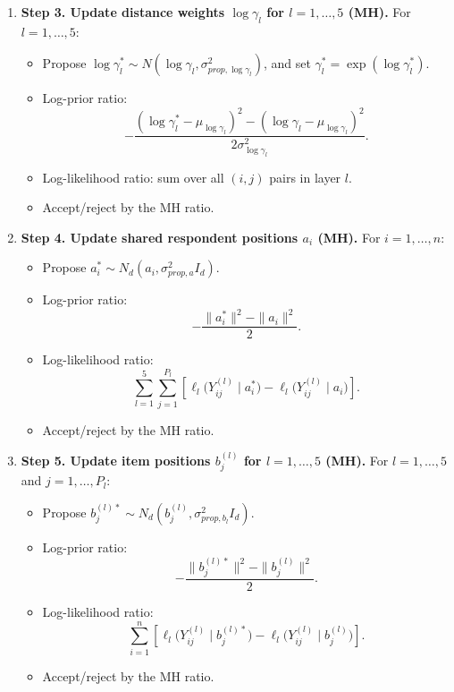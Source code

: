 \documentclass[11pt]{article}
\begin{document}
\begin{enumerate}[leftmargin=1.8em]
    \item \textbf{Step 3. Update distance weights $\log \gamma_l$ for $l=1,\dots,5$ (MH).}
    For $l=1,\dots,5$:
    \begin{itemize}[leftmargin=1.5em]
        \item Propose $\log \gamma_l^*\sim N(\log \gamma_l,\sigma_{prop,\log \gamma_l}^2)$, and set $\gamma_l^*=\exp(\log \gamma_l^*)$.
        \item Log-prior ratio:
        \[
        -\frac{(\log \gamma_l^*-\mu_{\log \gamma_l})^2-(\log \gamma_l-\mu_{\log \gamma_l})^2}{2\sigma_{\log \gamma_l}^2}.
        \]
        \item Log-likelihood ratio: sum over all $(i,j)$ pairs in layer $l$.
        \item Accept/reject by the MH ratio.
    \end{itemize}

    \item \textbf{Step 4. Update shared respondent positions $a_i$ (MH).}
    For $i=1,\dots,n$:
    \begin{itemize}[leftmargin=1.5em]
        \item Propose $a_i^*\sim N_d(a_i,\sigma_{prop,a}^2 I_d)$.
        \item Log-prior ratio:
        \[
        -\frac{\|a_i^*\|^2-\|a_i\|^2}{2}.
        \]
        \item Log-likelihood ratio:
        \[
        \sum_{l=1}^{5}\sum_{j=1}^{P_l}
        \left[\ell_l\bigl(Y_{ij}^{(l)}\mid a_i^*\bigr)-\ell_l\bigl(Y_{ij}^{(l)}\mid a_i\bigr)\right].
        \]
        \item Accept/reject by the MH ratio.
    \end{itemize}

    \item \textbf{Step 5. Update item positions $b_j^{(l)}$ for $l=1,\dots,5$ (MH).}
    For $l=1,\dots,5$ and $j=1,\dots,P_l$:
    \begin{itemize}[leftmargin=1.5em]
        \item Propose $b_j^{(l)*}\sim N_d(b_j^{(l)},\sigma_{prop,b_l}^2 I_d)$.
        \item Log-prior ratio:
        \[
        -\frac{\|b_j^{(l)*}\|^2-\|b_j^{(l)}\|^2}{2}.
        \]
        \item Log-likelihood ratio:
        \[
        \sum_{i=1}^{n}
        \left[\ell_l\bigl(Y_{ij}^{(l)}\mid b_j^{(l)*}\bigr)-\ell_l\bigl(Y_{ij}^{(l)}\mid b_j^{(l)}\bigr)\right].
        \]
        \item Accept/reject by the MH ratio.
    \end{itemize}


\end{enumerate}
\end{document}
